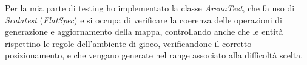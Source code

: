 Per la mia parte di testing ho implementato la classe \textit{ArenaTest}, che fa uso di \textit{Scalatest} (\textit{FlatSpec}) e si occupa di verificare la coerenza delle operazioni di generazione e aggiornamento della mappa, controllando anche che le entità rispettino le regole dell'ambiente di gioco, verificandone il corretto posizionamento, e che vengano generate nel range associato alla difficoltà scelta.